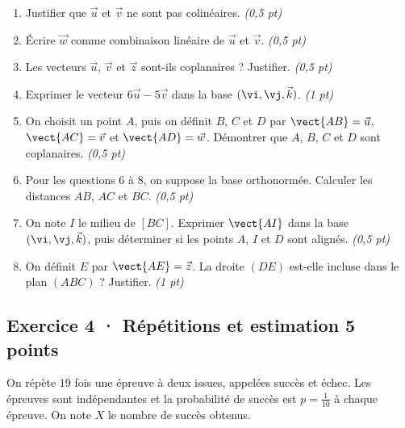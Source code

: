 \begin{enumerate}

\item Justifier que $\vec u$ et $\vec v$ ne sont pas colinéaires. \hfill\textit{(0,5 pt)}

\item Écrire $\vec w$ comme combinaison linéaire de $\vec u$ et $\vec v$. \hfill\textit{(0,5 pt)}

\item Les vecteurs $\vec u$, $\vec v$ et $\vec z$ sont-ils coplanaires ? Justifier. \hfill\textit{(0,5 pt)}

\item Exprimer le vecteur $6\vec u-5\vec v$ dans la base $(\vi,\vj,\vec k)$. \hfill\textit{(1 pt)}

\item On choisit un point $A$, puis on définit $B$, $C$ et $D$ par $\vect{AB}=\vec u$, $\vect{AC}=\vec v$ et $\vect{AD}=\vec w$. Démontrer que $A$, $B$, $C$ et $D$ sont coplanaires. \hfill\textit{(0,5 pt)}

\item Pour les questions 6 à 8, on suppose la base orthonormée. Calculer les distances $AB$, $AC$ et $BC$. \hfill\textit{(0,5 pt)}

\item On note $I$ le milieu de $[BC]$. Exprimer $\vect{AI}$ dans la base $(\vi,\vj,\vec k)$, puis déterminer si les points $A$, $I$ et $D$ sont alignés. \hfill\textit{(0,5 pt)}

\item On définit $E$ par $\vect{AE}=\vec z$. La droite $(DE)$ est-elle incluse dans le plan $(ABC)$ ? Justifier. \hfill\textit{(1 pt)}

\end{enumerate}

\subsection*{Exercice 4 · Répétitions et estimation \hfill 5 points}On répète $19$ fois une épreuve à deux issues, appelées succès et échec. Les épreuves sont indépendantes et la probabilité de succès est $p=\frac{1}{10}$ à chaque épreuve. On note $X$ le nombre de succès obtenus.

